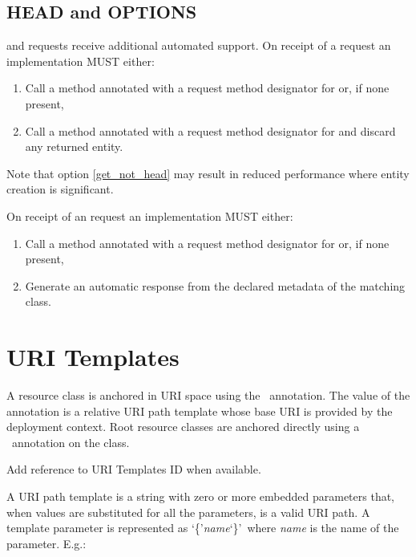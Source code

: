 \subsection{HEAD and OPTIONS}
\label{head_and_options}

 and  requests receive additional automated support. On receipt of a request an implementation MUST either:

\begin{enumerate}
\item Call a method annotated with a request method designator for  or, if none present,
\item\label{get_not_head} Call a method annotated with a request method designator for  and discard any returned entity.
\end{enumerate}

Note that option \ref{get_not_head} may result in reduced performance where entity creation is significant.

On receipt of an  request an implementation MUST either:

\begin{enumerate}
\item Call a method annotated with a request method designator for  or, if none present,
\item Generate an automatic response from the declared metadata of the matching class.
\end{enumerate}

\section{URI Templates}

A resource class is anchored in URI space using the \Path\ annotation. The value of the annotation is a relative URI path template whose base URI is provided by the deployment context. Root resource classes are anchored directly using a \Path\ annotation on the class.

\begin{ednote}Add reference to URI Templates ID when available.\end{ednote}

A URI path template is a string with zero or more embedded parameters that, when values are substituted for all the parameters, is a valid URI\cite{uri} path. A template parameter is represented as \lq\{\rq{\em name}\lq\}\rq\ where {\em name} is the name of the parameter. E.g.:

